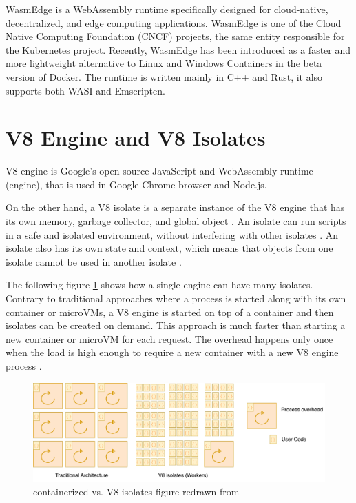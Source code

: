 WasmEdge \cite{he_2023_wasmedge} is a WebAssembly runtime specifically designed for cloud-native, decentralized, and \gls{edge computing} applications. WasmEdge is one of the Cloud Native Computing Foundation (CNCF) \cite{cloudnativecomputingfoundation_2023_cloud} projects, the same entity responsible for the Kubernetes project. Recently, WasmEdge has been introduced as a faster and more lightweight alternative to Linux and Windows Containers in the beta version of Docker. The runtime is written mainly in C++ and Rust, it also supports both WASI and Emscripten. 

\section{V8 Engine and V8 Isolates}
\label{sec:v8-comparison}

\gls{V8} engine is Google's open-source JavaScript and WebAssembly runtime (engine), that is used in Google Chrome browser and Node.js.

On the other hand, a V8 isolate is a separate instance of the V8 engine that has its own memory, garbage collector, and global object \cite{a2021_isolate}. An isolate can run scripts in a safe and isolated environment, without interfering with other isolates \cite{cloudflareinc_2023_how}. An isolate also has its own state and context, which means that objects from one isolate cannot be used in another isolate \cite{a2021_isolate}.

The following figure \ref{fig:v8-isolates} shows how a single engine can have many isolates. Contrary to traditional approaches where a process is started along with its own container or microVMs, a \gls{V8} engine is started on top of a container and then isolates can be created on demand. This approach is much faster than starting a new container or microVM for each request. The overhead happens only once when the load is high enough to require a new container with a new V8 engine process \cite{cloudflareinc_2023_how}.

\begin{figure}[H]
	\centering
		\includegraphics[width=\textwidth,height=\textheight,keepaspectratio]{images/runtimes/v8-isolates.pdf}
	\caption{containerized vs. \gls{V8} \glspl{isolate} figure redrawn from \cite{cloudflareinc_2023_how}}
	\label{fig:v8-isolates}
\end{figure}

